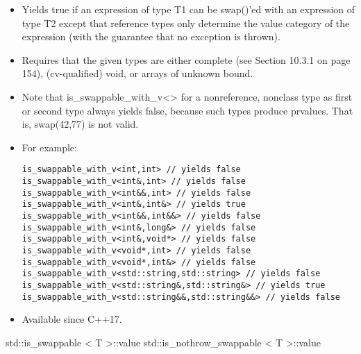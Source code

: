 \begin{itemize}
\item
Yields true if an expression of type T1 can be swap()’ed with an expression of type T2 except that reference types only determine the value category of the expression (with the guarantee that no exception is thrown).

\item
Requires that the given types are either complete (see Section 10.3.1 on page 154), (cv-qualified) void, or arrays of unknown bound.

\item
Note that is\_swappable\_with\_v<> for a nonreference, nonclass type as first or second type always yields false, because such types produce prvalues. That is, swap(42,77) is not valid.

\item
For example:
\begin{lstlisting}[style=styleCXX]
is_swappable_with_v<int,int> // yields false
is_swappable_with_v<int&,int> // yields false
is_swappable_with_v<int&&,int> // yields false
is_swappable_with_v<int&,int&> // yields true
is_swappable_with_v<int&&,int&&> // yields false
is_swappable_with_v<int&,long&> // yields false
is_swappable_with_v<int&,void*> // yields false
is_swappable_with_v<void*,int> // yields false
is_swappable_with_v<void*,int&> // yields false
is_swappable_with_v<std::string,std::string> // yields false
is_swappable_with_v<std::string&,std::string&> // yields true
is_swappable_with_v<std::string&&,std::string&&> // yields false
\end{lstlisting}

\item
Available since C++17.
\end{itemize}

std::is\_swappable < T >::value
std::is\_nothrow\_swappable < T >::value

